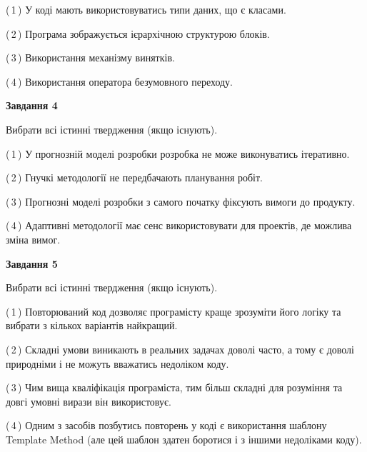 \documentclass[10pt, ukrainian]{article}
\begin{document}
{\begin {large}
(\,1\,) У коді мають використовуватись типи даних, що є класами. %



(\,2\,) Програма зображується ієрархічною структурою блоків.%



(\,3\,) Використання механізму винятків. %



(\,4\,) Використання оператора безумовного переходу. %


{\begin {center}\textbf{Завдання 4}\end {center}}\par
Вибрати всі істинні твердження (якщо існують).\par
\vspace{2mm}



(\,1\,) У прогнозній моделі розробки розробка не може виконуватись ітеративно. %



(\,2\,) Гнучкі методології не передбачають планування робіт. %



(\,3\,) Прогнозні моделі розробки з самого початку фіксують вимоги до продукту. %



(\,4\,) Адаптивні методології має сенс використовувати для проектів, де можлива зміна вимог. %


{\begin {center}\textbf{Завдання 5}\end {center}}\par
Вибрати всі істинні твердження (якщо існують).\par
\vspace{2mm}



(\,1\,) Повторюваний код дозволяє програмісту краще зрозуміти його логіку та вибрати з кількох варіантів найкращий. %



(\,2\,) Складні умови виникають в реальних задачах доволі часто, а тому є доволі природніми і не можуть вважатись недоліком коду. %



(\,3\,) Чим вища кваліфікація програміста, тим більш складні для розуміння та довгі умовні вирази він використовує. %



(\,4\,) Одним з засобів позбутись повторень у коді є використання шаблону Template Method (але цей шаблон здатен боротися і з іншими недоліками коду). %


\end{large}}
\end{document}
